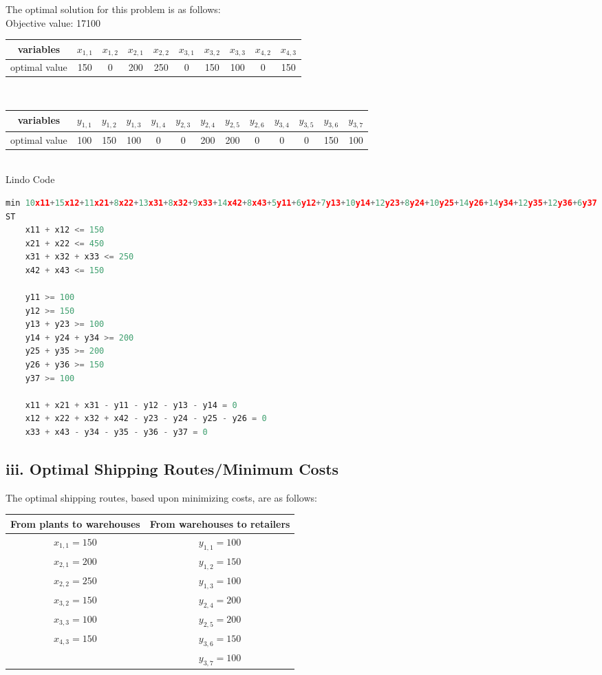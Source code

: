 \documentclass[11pt]{scrreprt}
\begin{document}
The optimal solution for this problem is as follows:\\

Objective value: 17100\\

\begin{tabular}{|c|c|c|c|c|c|c|c|c|c|}
	\hline variables & $x_{1,1}$   &  $x_{1,2}$ & $x_{2,1}$ & $x_{2,2}$ & $x_{3,1}$ & $x_{3,2}$ & $x_{3,3}$ & $x_{4,2}$ & $x_{4,3}$      \\
	\hline optimal value & 150  &  0 & 200 & 250 & 0 & 150 & 100 & 0 & 150            \\
	\hline
\end{tabular} \\

\begin{tabular}{|c|c|c|c|c|c|c|c|c|c|c|c|c|}
	\hline variables & $y_{1,1}$ & $y_{1,2}$ & $y_{1,3}$ & $y_{1,4}$ & $y_{2,3}$ & $y_{2,4}$ & $y_{2,5}$ & $y_{2,6}$ & $y_{3,4}$ & $y_{3,5}$ & $y_{3,6}$ & $y_{3,7}$  \\
	\hline optimal value & 	100 & 150 & 100 & 0 & 0 & 200 & 200 & 0 & 0 & 0 & 150 & 100 \\
	 \hline
\end{tabular} \\

Lindo Code
\begin{lstlisting}[language=c]
min 10x11+15x12+11x21+8x22+13x31+8x32+9x33+14x42+8x43+5y11+6y12+7y13+10y14+12y23+8y24+10y25+14y26+14y34+12y35+12y36+6y37
ST
	x11 + x12 <= 150
	x21 + x22 <= 450
	x31 + x32 + x33 <= 250
	x42 + x43 <= 150

	y11 >= 100
	y12 >= 150
	y13 + y23 >= 100
	y14 + y24 + y34 >= 200
	y25 + y35 >= 200
	y26 + y36 >= 150
	y37 >= 100

	x11 + x21 + x31 - y11 - y12 - y13 - y14 = 0
	x12 + x22 + x32 + x42 - y23 - y24 - y25 - y26 = 0
	x33 + x43 - y34 - y35 - y36 - y37 = 0
\end{lstlisting}

\subsection{iii. Optimal Shipping Routes/Minimum Costs}
The optimal shipping routes, based upon minimizing costs, are as follows: \\

\begin{tabular}{|c|c|}
	\hline From plants to warehouses & From warehouses to retailers \\
	\hline $x_{1,1} = 150$ & $y_{1,1} = 100$ \\
	\hline $x_{2,1} = 200$ &$y_{1,2} = 150$ \\
	\hline $x_{2,2} = 250$ &$y_{1,3} = 100$ \\
	\hline $x_{3,2} = 150$ &$y_{2,4} = 200$ \\
	\hline $x_{3,3} = 100$ & $y_{2,5} = 200$  \\
	\hline $x_{4,3} = 150$ & $y_{3,6} = 150$  \\
	\hline & $y_{3,7} = 100$ \\
	\hline
\end{tabular} \\
\end{document}
